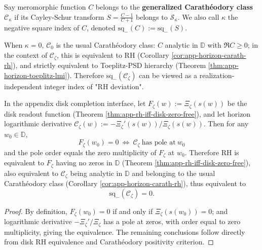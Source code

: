 \begin{definition}\label{def:xi-generalized-carath-class}
Say meromorphic function \(C\) belongs to the \textbf{generalized Carathéodory class} \(\mathcal{C}_{\kappa}\) if its Cayley-Schur transform
\(
S=\frac{C-1}{C+1}
\)
belongs to \(\mathcal{S}_{\kappa}\).
We also call \(\kappa\) the negative square index of \(C\), denoted \(\mathrm{sq}_-(C):=\mathrm{sq}_-(S)\).
\end{definition}

\begin{remark}\label{rem:xi-negative-squares-vs-psd}
When \(\kappa=0\), \(\mathcal{C}_0\) is the usual Carathéodory class: \(C\) analytic in \(\mathbb{D}\) with \(\Re C\ge 0\);
in the context of \(\mathscr{C}_{\zeta}\), this is equivalent to RH (Corollary \ref{cor:app-horizon-carath-rh}), and strictly equivalent to Toeplitz-PSD hierarchy (Theorem \ref{thm:app-horizon-toeplitz-lmi}).
Therefore \(\mathrm{sq}_-(\mathscr{C}_{\zeta})\) can be viewed as a realization-independent integer index of "RH deviation".
\end{remark}

\begin{theorem}\label{thm:xi-disk-zero-pole-index-reduction}
In the appendix disk completion interface, let
\(
F_{\zeta}(w):=\Xi_{\zeta}(s(w))
\)
be the disk readout function (Theorem \ref{thm:app-rh-iff-disk-zero-free}), and let horizon logarithmic derivative
\(
\mathscr{C}_{\zeta}(w):=-\Xi_{\zeta}'(s(w))/\Xi_{\zeta}(s(w))
\).
Then for any \(w_0\in\mathbb{D}\),
\[
\boxed{\;
F_{\zeta}(w_0)=0\ \Longleftrightarrow\ \mathscr{C}_{\zeta}\ \text{has pole at}\ w_0\;}
\]
and the pole order equals the zero multiplicity of \(F_{\zeta}\) at \(w_0\).
Therefore RH is equivalent to \(F_{\zeta}\) having no zeros in \(\mathbb{D}\) (Theorem \ref{thm:app-rh-iff-disk-zero-free}), also equivalent to \(\mathscr{C}_{\zeta}\) being analytic in \(\mathbb{D}\) and belonging to the usual Carathéodory class (Corollary \ref{cor:app-horizon-carath-rh}), thus equivalent to
\[
\boxed{\;\mathrm{sq}_-(\mathscr{C}_{\zeta})=0.\;}
\]
\end{theorem}

\begin{proof}
By definition, \(F_{\zeta}(w_0)=0\) if and only if \(\Xi_{\zeta}(s(w_0))=0\);
and logarithmic derivative \(-\Xi_{\zeta}'/\Xi_{\zeta}\) has a pole at zeros, with order equal to zero multiplicity, giving the equivalence.
The remaining conclusions follow directly from disk RH equivalence and Carathéodory positivity criterion.
\end{proof}


